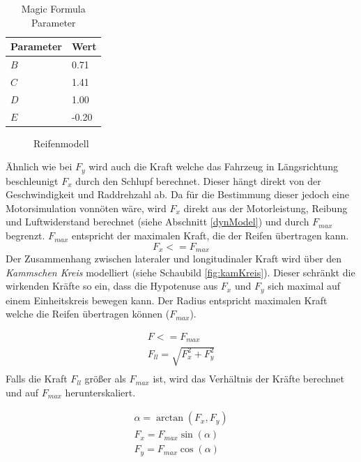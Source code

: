 \documentclass{like}
\begin{document}
\begin{table}[]
	\centering
	\begin{tabular}{l|l}
		\hline
		Parameter	& Wert \\ \hline
		\(B\)	&  0.71 \\
		\(C\)	&  1.41 \\
		\(D\)	&  1.00 \\
		\(E\)	& -0.20 \\

	\end{tabular}
	\caption{Magic Formula Parameter}
	\label{tireParam}
\end{table}

\begin{figure}[ht!]
	\centering
	 
	\caption{Reifenmodell}
	\label{fig:pacejka}
\end{figure}

Ähnlich wie bei \(F_y\) wird auch die Kraft welche das Fahrzeug in Längsrichtung beschleunigt \(F_x\) durch den Schlupf berechnet. Dieser hängt direkt von der Geschwindigkeit und Raddrehzahl ab. 
Da für die Bestimmung dieser jedoch eine Motorsimulation vonnöten wäre, wird \(F_x\) direkt aus der Motorleistung, Reibung und Luftwiderstand berechnet (siehe Abschnitt \ref{dynModel}) und durch \(F_{max}\) begrenzt. \(F_{max}\) entspricht der maximalen Kraft, die der Reifen übertragen kann.\\
\begin{equation}
F_x <= F_{max}
\end{equation}
Der Zusammenhang zwischen lateraler und longitudinaler Kraft wird über den \textit{Kammschen Kreis} modelliert (siehe Schaubild \ref{fig:kamKreis}). Dieser schränkt die wirkenden Kräfte so ein, dass die Hypotenuse aus \(F_x\) und \(F_y\) sich maximal auf einem Einheitskreis bewegen kann. Der Radius entspricht maximalen Kraft welche die Reifen übertragen können (\(F_{max}\)).

\begin{eqnarray}
F <= F_{max} \\
F_{ll} = \sqrt{F_x^2 + F_y^2}  \\
\end{eqnarray}
Falls die Kraft $F_{ll}$ größer als $F_{max}$ ist, wird das Verhältnis der Kräfte berechnet und auf $F_{max}$ herunterskaliert.

\begin{eqnarray}
\alpha = \arctan(F_x, F_y)\\
F_x = F_{max} \sin(\alpha)\\
F_y = F_{max} \cos(\alpha)\\ 
\end{eqnarray}
\end{document}
